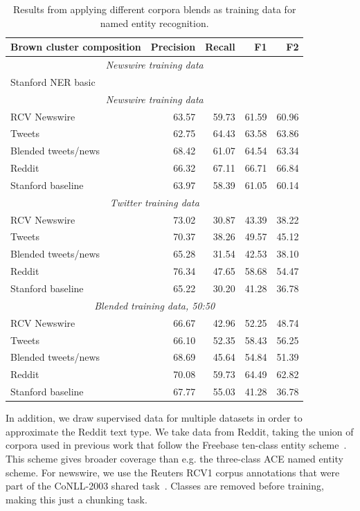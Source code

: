 \documentclass[10pt,journal,compsoc]{IEEEtran}
\begin{document}
\begin{table}
\centering
\caption{Results from applying different corpora blends as training data for named entity recognition.}
\begin{tabular}{lrrrr}
\hline
{\bf Brown cluster composition} & {\bf Precision} & {\bf Recall} & {\bf F1} & {\bf F2} \\
\hline
\multicolumn{5}{c}{\emph{Newswire training data}} \\
\hline
Stanford NER basic    & & & & \\
\multicolumn{5}{c}{\emph{Newswire training data}} \\
\hline
RCV Newswire          & 63.57 & 59.73 & 61.59 & 60.96 \\
Tweets                & 62.75 & 64.43 & 63.58 & 63.86 \\
Blended tweets/news   & 68.42 & 61.07 & 64.54 & 63.34 \\
Reddit                & 66.32 & 67.11 & 66.71 & 66.84 \\
Stanford baseline     & 63.97 & 58.39 & 61.05 & 60.14 \\
\hline
\multicolumn{5}{c}{\emph{Twitter training data}} \\
\hline
RCV Newswire          & 73.02 & 30.87 & 43.39 & 38.22 \\
Tweets                & 70.37 & 38.26 & 49.57 & 45.12 \\
Blended tweets/news   & 65.28 & 31.54 & 42.53 & 38.10 \\
Reddit                & 76.34 & 47.65 & 58.68 & 54.47 \\
Stanford baseline     & 65.22 & 30.20 & 41.28 & 36.78 \\
\hline
\multicolumn{5}{c}{\emph{Blended training data, 50:50}} \\
\hline
RCV Newswire          & 66.67 & 42.96 & 52.25 & 48.74 \\
Tweets                & 66.10 & 52.35 & 58.43 & 56.25 \\
Blended tweets/news   & 68.69 & 45.64 & 54.84 & 51.39 \\
Reddit                & 70.08 & 59.73 & 64.49 & 62.82 \\
Stanford baseline     & 67.77 & 55.03 & 41.28 & 36.78 \\
\hline
\end{tabular}
\label{tab:brown-tuning}
\end{table}


In addition, we draw supervised data for multiple datasets in order to approximate the Reddit text type.
We take data from Reddit, taking the union of corpora used in previous work that follow the Freebase ten-class entity scheme~\cite{ritter2011named,baldwin2015shared}.
This scheme gives broader coverage than e.g. the three-class ACE named entity scheme.
For newswire, we use the Reuters RCV1 corpus annotations that were part of the CoNLL-2003 shared task~\cite{tjong2003introduction}.
Classes are removed before training, making this just a chunking task.
\end{document}
